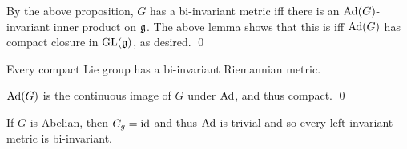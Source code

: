 \bproof

    By the above proposition, $G$ has a bi-invariant metric iff there is an ${\rm Ad}(G)$-invariant inner product on ${{\frak g}}$.
    The above lemma shows that this is iff ${\rm Ad}(G)$ has compact closure in ${\rm GL}({{\frak g}})$, as desired.
    \qed

\eproof

\bcoro

    Every compact Lie group has a bi-invariant Riemannian metric.

\ecoro

\bproof

    ${\rm Ad}(G)$ is the continuous image of $G$ under ${\rm Ad}$, and thus compact.
    \qed

\eproof

\bexam

    If $G$ is Abelian, then $C_g={\rm id}$ and thus ${\rm Ad}$ is trivial and so every left-invariant metric is bi-invariant.

\eexam

